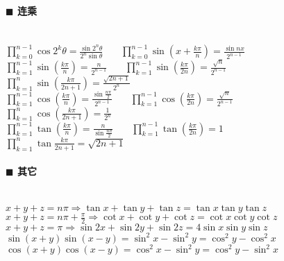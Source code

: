 \paragraph{$\blacksquare$ 连乘}
\noindent \\
${\displaystyle \prod _{{k=0}}^{{n-1}}\cos 2^{k}\theta ={\frac  {\sin 2^{n}\theta }{2^{n}\sin \theta }}}$~~~
${\displaystyle \prod _{{k=0}}^{{n-1}}\sin \left(x+{\frac  {k\pi }{n}}\right)={\frac  {\sin nx}{2^{{n-1}}}}}$\\
${\displaystyle \prod _{{k=1}}^{{n-1}}\sin \left({\frac  {k\pi }{n}}\right)={\frac  {n}{2^{{n-1}}}}}$~~~
${\displaystyle \prod _{{k=1}}^{{n-1}}\sin \left({\frac  {k\pi }{2n}}\right)={\frac  {{\sqrt  {n}}}{2^{{n-1}}}}}$~~~
${\displaystyle \prod _{{k=1}}^{{n}}\sin \left({\frac  {k\pi }{2n+1}}\right)={\frac  {{\sqrt  {2n+1}}}{2^{n}}}}$\\
${\displaystyle \prod _{{k=1}}^{{n-1}}\cos \left({\frac  {k\pi }{n}}\right)={\frac  {\sin {\frac  {n\pi }{2}}}{2^{{n-1}}}}}$~~~
${\displaystyle \prod _{{k=1}}^{{n-1}}\cos \left({\frac  {k\pi }{2n}}\right)={\frac  {{\sqrt  {n}}}{2^{{n-1}}}}}$~~~
${\displaystyle \prod _{{k=1}}^{n}\cos \left({\frac  {k\pi }{2n+1}}\right)={\frac  {1}{2^{n}}}}$\\
${\displaystyle \prod _{{k=1}}^{{n-1}}\tan \left({\frac  {k\pi }{n}}\right)={\frac  {n}{\sin {\frac  {n\pi }{2}}}}}$~~~
${\displaystyle \prod _{{k=1}}^{{n-1}}\tan \left({\frac  {k\pi }{2n}}\right)=1}$~~~
${\displaystyle \prod _{{k=1}}^{n}\tan {\frac  {k\pi }{2n+1}}={\sqrt  {2n+1}}}$\\
\paragraph{$\blacksquare$ 其它}
\noindent \\
$x+y+z=n\pi \Rightarrow \tan x+\tan y+\tan z=\tan x \tan y \tan z$\\
$x+y+z=n\pi +\frac{\pi}{2} \Rightarrow \cot x+\cot y+\cot z=\cot x \cot y \cot z$\\
$x+y+z=\pi \Rightarrow \sin 2x+\sin 2y+\sin 2z=4\sin x\sin y\sin z$\\
$\sin(x+y)\sin(x-y)=\sin ^{2}{x}-\sin ^{2}{y}=\cos ^{2}{y}-\cos ^{2}{x}$\\
$\cos(x+y)\cos(x-y)=\cos ^{2}{x}-\sin ^{2}{y}=\cos ^{2}{y}-\sin ^{2}{x}$


